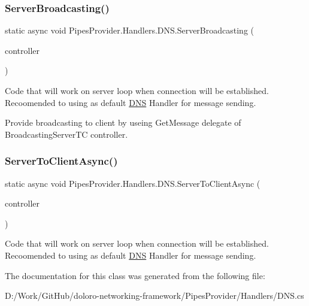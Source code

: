\subsubsection{\texorpdfstring{Server\+Broadcasting()}{ServerBroadcasting()}}
{\footnotesize\ttfamily static async void Pipes\+Provider.\+Handlers.\+D\+N\+S.\+Server\+Broadcasting (\begin{DoxyParamCaption}\item[{\mbox{\hyperlink{class_pipes_provider_1_1_server_1_1_transmission_controllers_1_1_base_server_transmission_controller}{Base\+Server\+Transmission\+Controller}}}]{controller }\end{DoxyParamCaption})\hspace{0.3cm}{\ttfamily [static]}}



Code that will work on server loop when connection will be established. Recoomended to using as default \mbox{\hyperlink{class_pipes_provider_1_1_handlers_1_1_d_n_s}{D\+NS}} Handler for message sending. 

Provide broadcasting to client by useing Get\+Message delegate of Broadcasting\+Server\+TC controller. \mbox{\label{class_pipes_provider_1_1_handlers_1_1_d_n_s_a8c278ec0c39ce0c76cb6ac9c92355aad}} 
\subsubsection{\texorpdfstring{Server\+To\+Client\+Async()}{ServerToClientAsync()}}
{\footnotesize\ttfamily static async void Pipes\+Provider.\+Handlers.\+D\+N\+S.\+Server\+To\+Client\+Async (\begin{DoxyParamCaption}\item[{\mbox{\hyperlink{class_pipes_provider_1_1_server_1_1_transmission_controllers_1_1_base_server_transmission_controller}{Base\+Server\+Transmission\+Controller}}}]{controller }\end{DoxyParamCaption})\hspace{0.3cm}{\ttfamily [static]}}



Code that will work on server loop when connection will be established. Recoomended to using as default \mbox{\hyperlink{class_pipes_provider_1_1_handlers_1_1_d_n_s}{D\+NS}} Handler for message sending. 



The documentation for this class was generated from the following file\+:\begin{DoxyCompactItemize}
\item 
D\+:/\+Work/\+Git\+Hub/doloro-\/networking-\/framework/\+Pipes\+Provider/\+Handlers/D\+N\+S.\+cs\end{DoxyCompactItemize}
